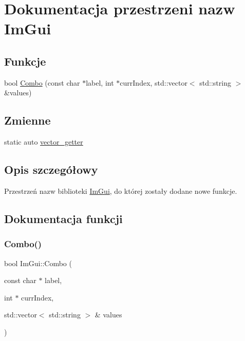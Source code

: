 \hypertarget{namespace_im_gui}{}\section{Dokumentacja przestrzeni nazw Im\+Gui}
\label{namespace_im_gui}
\subsection*{Funkcje}
\begin{DoxyCompactItemize}
\item 
bool \mbox{\hyperlink{namespace_im_gui_a405b19deb7db39d92f42ac1329740892}{Combo}} (const char $\ast$label, int $\ast$curr\+Index, std\+::vector$<$ std\+::string $>$ \&values)
\end{DoxyCompactItemize}
\subsection*{Zmienne}
\begin{DoxyCompactItemize}
\item 
static auto \mbox{\hyperlink{namespace_im_gui_a60811991fd9baf2b2f86bd99efd4b741}{vector\+\_\+getter}}
\end{DoxyCompactItemize}


\subsection{Opis szczegółowy}
Przestrzeń nazw biblioteki \mbox{\hyperlink{namespace_im_gui}{Im\+Gui}}, do której zostały dodane nowe funkcje. 

\subsection{Dokumentacja funkcji}
\mbox{\label{namespace_im_gui_a405b19deb7db39d92f42ac1329740892}} 
\subsubsection{\texorpdfstring{Combo()}{Combo()}}
{\footnotesize\ttfamily bool Im\+Gui\+::\+Combo (\begin{DoxyParamCaption}\item[{const char $\ast$}]{label,  }\item[{int $\ast$}]{curr\+Index,  }\item[{std\+::vector$<$ std\+::string $>$ \&}]{values }\end{DoxyParamCaption})}

